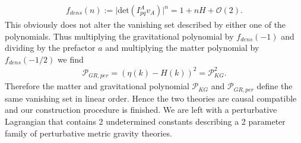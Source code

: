 \documentclass[a4paper,12pt, DIV=14, BCOR=5mm, twoside, headsepline]{scrbook}
\begin{document}
\begin{align}
    f_{dens}(n) := \vert \mathrm{det}\left (I^A_{pq}v_A \right )\vert ^n = 1 + nH + \mathcal{O}(2).
\end{align}
This obviously does not alter the vanishing set described by either one of the polynomials. Thus multiplying the gravitational polynomial by $f_{dens}(-1)$ and dividing by the prefactor $a$ and multiplying the matter polynomial by $f_{dens}(-1/2)$ we find
\begin{align}
    \mathcal{P}_{GR,per} = (\eta(k)-H(k))^2 = \mathcal{P}_{KG}^2.
\end{align}
Therefore the matter and gravitational polynomial $\mathcal{P}_{KG}$ and $\mathcal{P}_{GR,per}$ define the same vanishing set in linear order.
Hence the two theories are causal compatible and our construction procedure is finished. We are left with a perturbative Lagrangian that contains 2 undetermined constants describing a 2 parameter family of perturbative metric gravity theories.  \\
\end{document}
